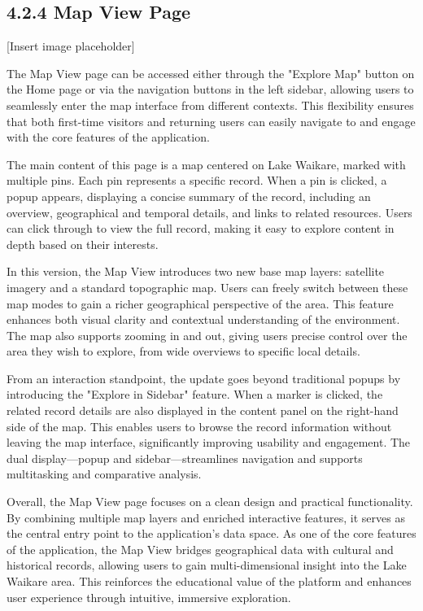 \subsection*{4.2.4 Map View Page}
[Insert image placeholder]

The Map View page can be accessed either through the "Explore Map" button on the Home page or via the navigation buttons in the left sidebar, allowing users to seamlessly enter the map interface from different contexts. This flexibility ensures that both first-time visitors and returning users can easily navigate to and engage with the core features of the application.

The main content of this page is a map centered on Lake Waikare, marked with multiple pins. Each pin represents a specific record. When a pin is clicked, a popup appears, displaying a concise summary of the record, including an overview, geographical and temporal details, and links to related resources. Users can click through to view the full record, making it easy to explore content in depth based on their interests.

In this version, the Map View introduces two new base map layers: satellite imagery and a standard topographic map. Users can freely switch between these map modes to gain a richer geographical perspective of the area. This feature enhances both visual clarity and contextual understanding of the environment. The map also supports zooming in and out, giving users precise control over the area they wish to explore, from wide overviews to specific local details.

From an interaction standpoint, the update goes beyond traditional popups by introducing the "Explore in Sidebar" feature. When a marker is clicked, the related record details are also displayed in the content panel on the right-hand side of the map. This enables users to browse the record information without leaving the map interface, significantly improving usability and engagement. The dual display—popup and sidebar—streamlines navigation and supports multitasking and comparative analysis.

Overall, the Map View page focuses on a clean design and practical functionality. By combining multiple map layers and enriched interactive features, it serves as the central entry point to the application's data space. As one of the core features of the application, the Map View bridges geographical data with cultural and historical records, allowing users to gain multi-dimensional insight into the Lake Waikare area. This reinforces the educational value of the platform and enhances user experience through intuitive, immersive exploration.

